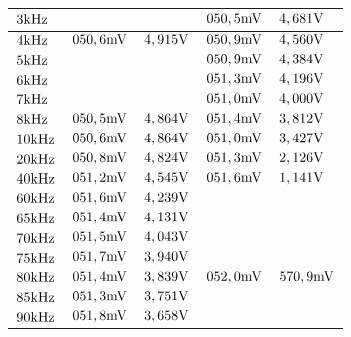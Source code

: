 \begin{table}[H]
\begin{tabular}{l||l|l||l|l|}
\multicolumn{1}{|l||}{$3\text{kHz}$}                       &$              $&$             $&$ 050,5\text{mV}    $&$ 4,681\text{V}        $\\ \hline
\multicolumn{1}{|l||}{$4\text{kHz}$}                       &$ 050,6\text{mV}     $&$ 4,915\text{V}       $&$ 050,9\text{mV}    $&$ 4,560\text{V}        $\\ \hline
\multicolumn{1}{|l||}{$5\text{kHz}$}                       &$              $&$             $&$ 050,9\text{mV}    $&$ 4,384\text{V}        $\\ \hline
\multicolumn{1}{|l||}{$6\text{kHz}$}                       &$              $&$             $&$ 051,3\text{mV}    $&$ 4,196\text{V}        $\\ \hline
\multicolumn{1}{|l||}{$7\text{kHz}$}                       &$              $&$             $&$ 051,0\text{mV}    $&$ 4,000\text{V}        $\\ \hline
\multicolumn{1}{|l||}{$8\text{kHz}$}                       &$ 050,5\text{mV}     $&$ 4,864\text{V}       $&$ 051,4\text{mV}    $&$ 3,812\text{V}        $\\ \hline
\multicolumn{1}{|l||}{$10\text{kHz}$}                      &$ 050,6\text{mV}     $&$ 4,864\text{V}       $&$ 051,0\text{mV}    $&$ 3,427\text{V}        $\\ \hline
\multicolumn{1}{|l||}{$20\text{kHz}$}                      &$ 050,8\text{mV}     $&$ 4,824\text{V}       $&$ 051,3\text{mV}    $&$ 2,126\text{V}        $\\ \hline
\multicolumn{1}{|l||}{$40\text{kHz}$}                      &$ 051,2\text{mV}     $&$ 4,545\text{V}       $&$ 051,6\text{mV}    $&$ 1,141\text{V}        $\\ \hline
\multicolumn{1}{|l||}{$60\text{kHz}$}                      &$ 051,6\text{mV}     $&$ 4,239\text{V}       $&$             $&$              $\\ \hline
\multicolumn{1}{|l||}{$65\text{kHz}$}                      &$ 051,4\text{mV}     $&$ 4,131\text{V}       $&$             $&$              $\\ \hline
\multicolumn{1}{|l||}{$70\text{kHz}$}                      &$ 051,5\text{mV}     $&$ 4,043\text{V}       $&$             $&$              $\\ \hline
\multicolumn{1}{|l||}{$75\text{kHz}$}                      &$ 051,7\text{mV}     $&$ 3,940\text{V}       $&$             $&$              $\\ \hline
\multicolumn{1}{|l||}{$80\text{kHz}$}                      &$ 051,4\text{mV}     $&$ 3,839\text{V}       $&$ 052,0\text{mV}    $&$ 570,9\text{mV}     $\\ \hline
\multicolumn{1}{|l||}{$85\text{kHz}$}                      &$ 051,3\text{mV}     $&$ 3,751\text{V}       $&$             $&$              $\\ \hline
\multicolumn{1}{|l||}{$90\text{kHz}$}                      &$ 051,8\text{mV}     $&$ 3,658\text{V}       $&$             $&$              $\\ \hline

\end{tabular}
\end{table}

